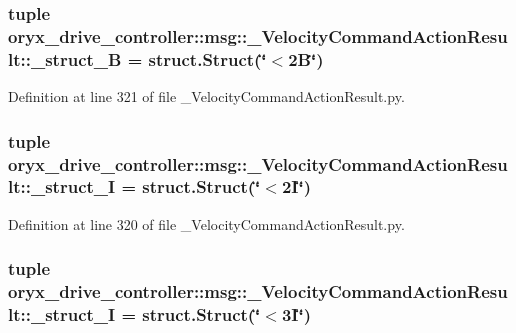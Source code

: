 \subsubsection[{\-\_\-struct\-\_\-2\-B}]{\setlength{\rightskip}{0pt plus 5cm}tuple {\bf oryx\-\_\-drive\-\_\-controller\-::msg\-::\-\_\-\-Velocity\-Command\-Action\-Result\-::\-\_\-struct\-\_\-B} = struct.\-Struct(\char`\"{}$<$2\-B\char`\"{})}\label{namespaceoryx__drive__controller_1_1msg_1_1__VelocityCommandActionResult_a104933c8e8d71cd43e2e25ab08b334a9}


\-Definition at line 321 of file \-\_\-\-Velocity\-Command\-Action\-Result.\-py.

\subsubsection[{\-\_\-struct\-\_\-2\-I}]{\setlength{\rightskip}{0pt plus 5cm}tuple {\bf oryx\-\_\-drive\-\_\-controller\-::msg\-::\-\_\-\-Velocity\-Command\-Action\-Result\-::\-\_\-struct\-\_\-I} = struct.\-Struct(\char`\"{}$<$2\-I\char`\"{})}\label{namespaceoryx__drive__controller_1_1msg_1_1__VelocityCommandActionResult_a22812aedf743ae9fae5d298f8c8a58bc}


\-Definition at line 320 of file \-\_\-\-Velocity\-Command\-Action\-Result.\-py.

\subsubsection[{\-\_\-struct\-\_\-3\-I}]{\setlength{\rightskip}{0pt plus 5cm}tuple {\bf oryx\-\_\-drive\-\_\-controller\-::msg\-::\-\_\-\-Velocity\-Command\-Action\-Result\-::\-\_\-struct\-\_\-I} = struct.\-Struct(\char`\"{}$<$3\-I\char`\"{})}\label{namespaceoryx__drive__controller_1_1msg_1_1__VelocityCommandActionResult_ac5e23afd7c23ae2128182ad4a6e1034b}


